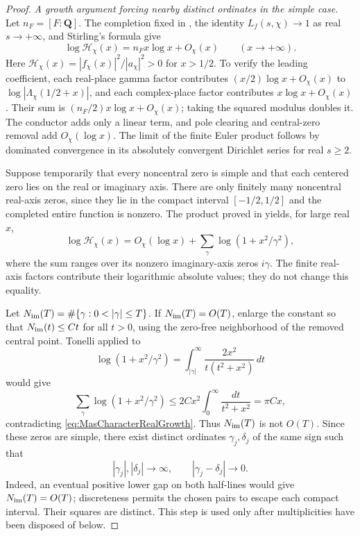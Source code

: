 \begin{proof}
\emph{A growth argument forcing nearby distinct ordinates in the simple case.}
Let $n_F=[F:\mathbf Q]$. The completion fixed in , the identity $L_f(s,\chi)\to1$ as real $s\to+\infty$, and Stirling's formula \cite[(5.11.1)]{dlmf511} give
\begin{equation}\label{eq:MasCharacterRealGrowth}
 \log\mathcal H_\chi(x)=n_F x\log x+O_\chi(x)
 \qquad(x\to+\infty).
\end{equation}
Here $\mathcal H_\chi(x)=|f_\chi(x)|^2/|a_\chi|^2>0$ for $x>1/2$. To verify the leading coefficient, each real-place gamma factor contributes $(x/2)\log x+O_\chi(x)$ to $\log|\Lambda_\chi(1/2+x)|$, and each complex-place factor contributes $x\log x+O_\chi(x)$. Their sum is $(n_F/2)x\log x+O_\chi(x)$; taking the squared modulus doubles it. The conductor adds only a linear term, and pole clearing and central-zero removal add $O_\chi(\log x)$. The limit of the finite Euler product follows by dominated convergence in its absolutely convergent Dirichlet series for real $s\ge2$.

Suppose temporarily that every noncentral zero is simple and that each centered zero lies on the real or imaginary axis. There are only finitely many noncentral real-axis zeros, since they lie in the compact interval $[-1/2,1/2]$ and the completed entire function is nonzero. The product proved in  yields, for large real $x$,
\[
 \log\mathcal H_\chi(x)
 =O_\chi(\log x)
  +\sum_{\gamma}\log(1+x^2/\gamma^2),
\]
where the sum ranges over its nonzero imaginary-axis zeros $i\gamma$. The finite real-axis factors contribute their logarithmic absolute values; they do not change this equality.

Let $N_{\rm im}(T)=\#\{\gamma:0<|\gamma|\le T\}$. If $N_{\rm im}(T)=O(T)$, enlarge the constant so that $N_{\rm im}(t)\le Ct$ for all $t>0$, using the zero-free neighborhood of the removed central point. Tonelli applied to
\[
 \log(1+x^2/\gamma^2)
 =\int_{|\gamma|}^{\infty}\frac{2x^2}{t(t^2+x^2)}\,dt
\]
would give
\[
 \sum_\gamma\log(1+x^2/\gamma^2)
 \le2Cx^2\int_0^\infty\frac{dt}{t^2+x^2}=\pi Cx,
\]
contradicting \eqref{eq:MasCharacterRealGrowth}. Thus $N_{\rm im}(T)$ is not $O(T)$. Since these zeros are simple, there exist distinct ordinates $\gamma_j,\delta_j$ of the same sign such that
\[
 |\gamma_j|,|\delta_j|\longrightarrow\infty,
 \qquad |\gamma_j-\delta_j|\longrightarrow0.
\]
Indeed, an eventual positive lower gap on both half-lines would give $N_{\rm im}(T)=O(T)$; discreteness permits the chosen pairs to escape each compact interval. Their squares are distinct. This step is used only after multiplicities have been disposed of below.


\end{proof}
